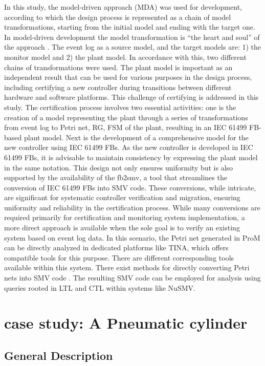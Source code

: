 \begin{bibunit}
In this study, the model-driven approach (MDA) was used for development, according to which the design process is represented as a chain of model transformations, starting from the initial model and ending with the target one. In model-driven development the model transformation is “the heart and soul” of the approach \cite{sendall2003model}.
The event log as a source model, and the target models are: 1) the monitor model and 2) the plant model. In accordance with this, two different chains of transformations were used. The plant model is important as an independent result that can be used for various purposes in the design process, including certifying a new controller during transitions between different hardware and software platforms. This challenge of certifying is addressed in this study.
The certification process involves two essential activities: one is the creation of a model representing the plant through a series of transformations from event log to Petri net, RG, FSM of the plant, resulting in an IEC 61499 FB-based plant model. Next is the development of a comprehensive model for the new controller using IEC 61499 FBs. As the new controller is developed in IEC 61499 FBs, it is advisable to maintain consistency by expressing the plant model in the same notation. This design not only ensures uniformity but is also supported by the availability of the fb2smv, a tool that streamlines the conversion of IEC 61499 FBs into SMV code. These conversions, while intricate, are significant for systematic controller verification and migration, ensuring uniformity and reliability in the certification process. While many conversions are required primarily for certification and monitoring system implementation, a more direct approach is available when the sole goal is to verify an existing system based on event log data. In this scenario, the Petri net generated in ProM can be directly analyzed in dedicated platforms like TINA, which offers compatible tools for this purpose. There are different corresponding tools available within this system. There exist methods for directly converting Petri nets into SMV code \cite{wimmel1997bdd}. The resulting SMV code can be employed for analysis using queries rooted in LTL and CTL within systems like NuSMV.



\section{case study: A Pneumatic cylinder}
\label{cs}
\subsection{General Description}


\end{bibunit}
